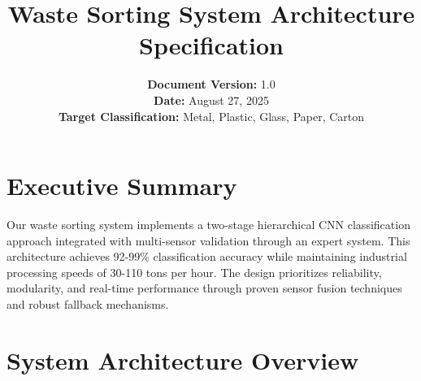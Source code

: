 \documentclass[11pt, a4paper]{article}
\title{Waste Sorting System Architecture Specification}
\author{
    \textbf{Document Version:} 1.0 \\
    \textbf{Date:} August 27, 2025 \\
    \textbf{Target Classification:} Metal, Plastic, Glass, Paper, Carton
}
\date{} %
\begin{document}
\maketitle
\tableofcontents
\newpage

\section{Executive Summary}

Our waste sorting system implements a two-stage hierarchical CNN classification approach integrated with multi-sensor validation through an expert system. This architecture achieves 92-99\% classification accuracy while maintaining industrial processing speeds of 30-110 tons per hour. The design prioritizes reliability, modularity, and real-time performance through proven sensor fusion techniques and robust fallback mechanisms.

\section{System Architecture Overview}
\end{document}
